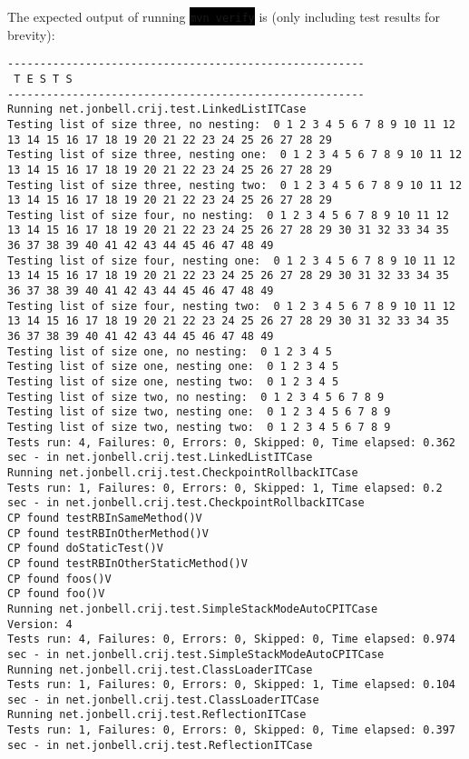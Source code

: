 \documentclass[12pt]{article}
\newcommand{\command}[1]{\colorbox{black}{\texttt{\color{white}#1}}}
\begin{document}
The expected output of running \command{mvn verify} is (only including test results for brevity):
\begin{scriptsize}
\begin{verbatim}
-------------------------------------------------------
 T E S T S
-------------------------------------------------------
Running net.jonbell.crij.test.LinkedListITCase
Testing list of size three, no nesting:  0 1 2 3 4 5 6 7 8 9 10 11 12 13 14 15 16 17 18 19 20 21 22 23 24 25 26 27 28 29
Testing list of size three, nesting one:  0 1 2 3 4 5 6 7 8 9 10 11 12 13 14 15 16 17 18 19 20 21 22 23 24 25 26 27 28 29
Testing list of size three, nesting two:  0 1 2 3 4 5 6 7 8 9 10 11 12 13 14 15 16 17 18 19 20 21 22 23 24 25 26 27 28 29
Testing list of size four, no nesting:  0 1 2 3 4 5 6 7 8 9 10 11 12 13 14 15 16 17 18 19 20 21 22 23 24 25 26 27 28 29 30 31 32 33 34 35 36 37 38 39 40 41 42 43 44 45 46 47 48 49
Testing list of size four, nesting one:  0 1 2 3 4 5 6 7 8 9 10 11 12 13 14 15 16 17 18 19 20 21 22 23 24 25 26 27 28 29 30 31 32 33 34 35 36 37 38 39 40 41 42 43 44 45 46 47 48 49
Testing list of size four, nesting two:  0 1 2 3 4 5 6 7 8 9 10 11 12 13 14 15 16 17 18 19 20 21 22 23 24 25 26 27 28 29 30 31 32 33 34 35 36 37 38 39 40 41 42 43 44 45 46 47 48 49
Testing list of size one, no nesting:  0 1 2 3 4 5
Testing list of size one, nesting one:  0 1 2 3 4 5
Testing list of size one, nesting two:  0 1 2 3 4 5
Testing list of size two, no nesting:  0 1 2 3 4 5 6 7 8 9
Testing list of size two, nesting one:  0 1 2 3 4 5 6 7 8 9
Testing list of size two, nesting two:  0 1 2 3 4 5 6 7 8 9
Tests run: 4, Failures: 0, Errors: 0, Skipped: 0, Time elapsed: 0.362 sec - in net.jonbell.crij.test.LinkedListITCase
Running net.jonbell.crij.test.CheckpointRollbackITCase
Tests run: 1, Failures: 0, Errors: 0, Skipped: 1, Time elapsed: 0.2 sec - in net.jonbell.crij.test.CheckpointRollbackITCase
CP found testRBInSameMethod()V
CP found testRBInOtherMethod()V
CP found doStaticTest()V
CP found testRBInOtherStaticMethod()V
CP found foos()V
CP found foo()V
Running net.jonbell.crij.test.SimpleStackModeAutoCPITCase
Version: 4
Tests run: 4, Failures: 0, Errors: 0, Skipped: 0, Time elapsed: 0.974 sec - in net.jonbell.crij.test.SimpleStackModeAutoCPITCase
Running net.jonbell.crij.test.ClassLoaderITCase
Tests run: 1, Failures: 0, Errors: 0, Skipped: 1, Time elapsed: 0.104 sec - in net.jonbell.crij.test.ClassLoaderITCase
Running net.jonbell.crij.test.ReflectionITCase
Tests run: 1, Failures: 0, Errors: 0, Skipped: 0, Time elapsed: 0.397 sec - in net.jonbell.crij.test.ReflectionITCase

\end{verbatim}
\end{scriptsize}
\end{document}
